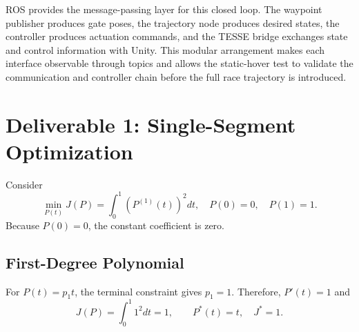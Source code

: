 \documentclass[letterpaper,10pt,conference]{IEEEtran}
\begin{document}
ROS provides the message-passing layer for this closed loop. The waypoint publisher produces gate poses, the trajectory node produces desired states, the controller produces actuation commands, and the TESSE bridge exchanges state and control information with Unity. This modular arrangement makes each interface observable through topics and allows the static-hover test to validate the communication and controller chain before the full race trajectory is introduced.

\section{Deliverable 1: Single-Segment Optimization}
Consider
\begin{equation}
\min_{P(t)}J(P)=\int_0^1\left(P^{(1)}(t)\right)^2dt,
\quad P(0)=0,\quad P(1)=1.
\label{eq:minvel}
\end{equation}
Because $P(0)=0$, the constant coefficient is zero.

\subsection{First-Degree Polynomial}
For $P(t)=p_1t$, the terminal constraint gives $p_1=1$. Therefore, $P'(t)=1$ and
\begin{equation}
J(P)=\int_0^1 1^2dt=1,
\qquad \boxed{P^*(t)=t,\quad J^*=1.}
\end{equation}
\end{document}
